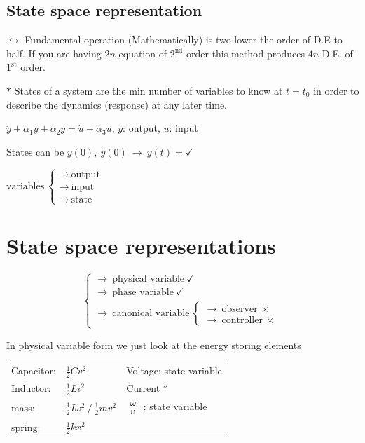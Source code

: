\documentclass[11pt,a4paper]{article}
\begin{document}
\subsection{State space representation}

$\hookrightarrow$ Fundamental operation (Mathematically) is two lower the order of D.E to half. If you are having $2n$ equation of $2^{\mathrm{nd}}$ order this method produces $4n$ D.E. of $1^{\mathrm{st}}$ order.

$\ast$ States of a system are the min number of variables to know at $t=t_0$ in order to describe the dynamics (response) at any later time.

\begin{ornek}
$\ddot{y}+\alpha_1\dot{y}+\alpha_2 y=\dot{u}+\alpha_3 u$, \quad $y$: output, $u$: input

States can be $y(0),\ \dot{y}(0)\ \to\ y(t)=\checkmark$
\end{ornek}

$\text{variables}\ \left\{\begin{array}{l}\to\ \text{output}\\ \to\ \text{input}\\ \to\ \text{state}\end{array}\right.$

\section{State space representations}

\[
\left\{\begin{array}{l}
\to\ \text{physical variable}\ \checkmark\\
\to\ \text{phase variable}\ \checkmark\\
\to\ \text{canonical variable}\ \left\{\begin{array}{l}\to\ \text{observer}\ \times\\ \to\ \text{controller}\ \times\end{array}\right.
\end{array}\right.
\]

In physical variable form we just look at the energy storing elements

\begin{tabular}{@{}l@{\ }l@{\qquad\qquad}l@{}}
Capacitor: & $\frac{1}{2}Cv^2$ & Voltage: state variable\\
Inductor: & $\frac{1}{2}Li^2$ & Current \quad $''$\\
mass: & $\frac{1}{2}I\omega^2\ /\ \frac{1}{2}mv^2$ & $\substack{\omega\\ v}$ : state variable\\
spring: & $\frac{1}{2}kx^2$ &
\end{tabular}
\end{document}
